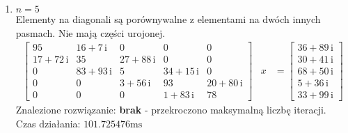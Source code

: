 \documentclass[12pt]{article}
\begin{document}
\begin{enumerate}[label=\textbf{Układ \arabic*}]
		\item
			$n = 5$\\
			Elementy na diagonali są porównywalne z elementami na dwóch innych pasmach. Nie mają części urojonej.
			\begin{align*}
				\left[
					\begin{array}{ccccc} 95 & 16 + 7\, \mathrm{i} & 0 & 0 & 0\\ 17 + 72\, \mathrm{i} & 35 & 27 + 88\, \mathrm{i} & 0 & 0\\ 0 & 83 + 93\, \mathrm{i} & 5 & 34 + 15\, \mathrm{i} & 0\\ 0 & 0 & 3 + 56\, \mathrm{i} & 93 & 20 + 80\, \mathrm{i}\\ 0 & 0 & 0 & 1 + 83\, \mathrm{i} & 78 \end{array}
				\right]
				&x
				&=
				\left[
					\begin{array}{c} 36 + 89\, \mathrm{i}\\ 30 + 41\, \mathrm{i}\\ 68 + 50\, \mathrm{i}\\ 5 + 36\, \mathrm{i}\\ 33 + 99\, \mathrm{i} \end{array}
				\right]
			\end{align*}
			Znalezione rozwiązanie: \textbf{brak} - przekroczono maksymalną liczbę iteracji.\\
			Czas działania: $101.725476\text{ms}$
		

\end{enumerate}
\end{document}
